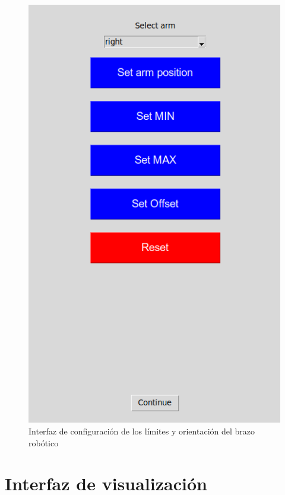 \begin{figure}[ht!]
	\centering
	\begin{minipage}{0.45\linewidth}
		\centering
		\includegraphics[width=\linewidth]{figs/config_limits.png}
	\end{minipage}
	\caption[Interfaz de configuración de los límites y orientación del brazo robótico]{Interfaz de configuración de los límites y orientación del brazo robótico}
	\label{fig:config}
\end{figure}

\section{Interfaz de visualización}
\label{section:visualization}


